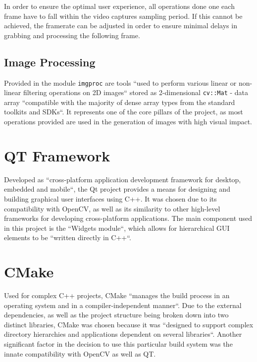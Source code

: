 In order to ensure the optimal user experience, all operations done one each frame have to fall within
the video captures sampling period. If this cannot be achieved, the framerate can be adjusted in order
to ensure minimal delays in grabbing and processing the following frame.

\subsection{Image Processing}

Provided in the module \verb|imgproc| are tools ``used to perform various linear or non-linear filtering 
operations on 2D images`` stored as 2-dimensional \verb|cv::Mat| - data array ``compatible with the 
majority of dense array types from the standard toolkits and SDKs``.  It represents one of the core 
pillars of the project, as most operations provided are used in the generation of images with high 
visual impact. \cite{opencvImproc}

\section{QT Framework}

Developed as ``cross-platform application development framework for desktop, embedded and mobile``, the
Qt project provides a means for designing and building graphical user interfaces using C++. It was chosen 
due to its compatibility with OpenCV, as well as its similarity to other high-level frameworks for 
developing cross-platform applications. The main component used in this project is the ``Widgets module``,
which allows for hierarchical GUI elements to be ``written directly in C++``.\cite{qtAbout}

\section{CMake}

Used for complex C++ projects, CMake ``manages the build process in an operating system and in a 
compiler-independent manner``. Due to the external dependencies, as well as the project structure being 
broken down into two distinct libraries, CMake was chosen because it was ``designed to support complex 
directory hierarchies and applications dependent on several libraries``. Another significant factor in the
decision to use this particular build system was the innate compatibility with OpenCV as well as QT.
\cite{cmakeAbout}


